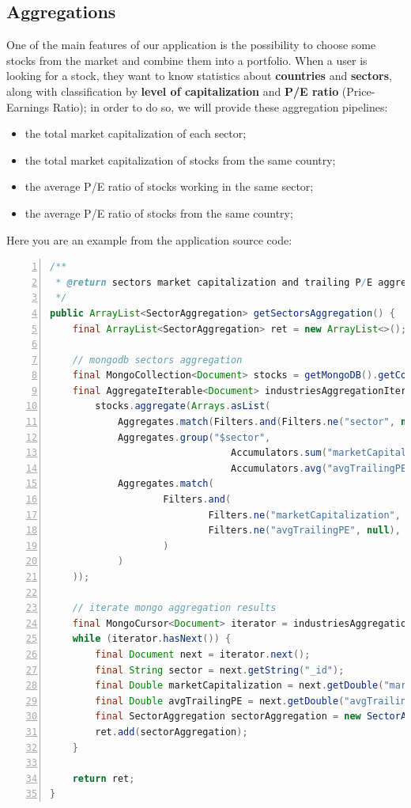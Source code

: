 \subsection{Aggregations}
One of the main features of our application is the possibility to choose some
stocks from the market and combine them into a portfolio. When a user is looking
for a stock, they want to know statistics about \textbf{countries} and
\textbf{sectors}, along with classification by \textbf{level of capitalization}
and \textbf{P/E ratio} (Price-Earnings Ratio); in order to do so, we will
provide these aggregation pipelines:
\begin{itemize}
    \item the total market capitalization of each sector;
    \item the total market capitalization of stocks from the same country;
    \item the average P/E ratio of stocks working in the same sector;
    \item the average P/E ratio of stocks from the same country;
\end{itemize}
Here you are an example from the application source code:
\begin{lstlisting}[basicstyle=\footnotesize,language=Java,numbers=left,
    numberstyle=\footnotesize,numbersep=4pt,frame=single]
/**
 * @return sectors market capitalization and trailing P/E aggregation.
 */
public ArrayList<SectorAggregation> getSectorsAggregation() {
    final ArrayList<SectorAggregation> ret = new ArrayList<>();

    // mongodb sectors aggregation
    final MongoCollection<Document> stocks = getMongoDB().getCollection(StocksimCollection.STOCKS.getCollectionName());
    final AggregateIterable<Document> industriesAggregationIterable =
        stocks.aggregate(Arrays.asList(
            Aggregates.match(Filters.and(Filters.ne("sector", null), Filters.ne("sector", ""))),
            Aggregates.group("$sector",
                                Accumulators.sum("marketCapitalization", "$marketCap"),
                                Accumulators.avg("avgTrailingPE", "$trailingPE")),
            Aggregates.match(
                    Filters.and(
                            Filters.ne("marketCapitalization", null), Filters.ne("marketCapitalization", ""),
                            Filters.ne("avgTrailingPE", null), Filters.ne("avgTrailingPE", "")
                    )
            )
    ));

    // iterate mongo aggregation results
    final MongoCursor<Document> iterator = industriesAggregationIterable.iterator();
    while (iterator.hasNext()) {
        final Document next = iterator.next();
        final String sector = next.getString("_id");
        final Double marketCapitalization = next.getDouble("marketCapitalization");
        final Double avgTrailingPE = next.getDouble("avgTrailingPE");
        final SectorAggregation sectorAggregation = new SectorAggregation(sector, marketCapitalization, avgTrailingPE);
        ret.add(sectorAggregation);
    }

    return ret;
}
\end{lstlisting}
